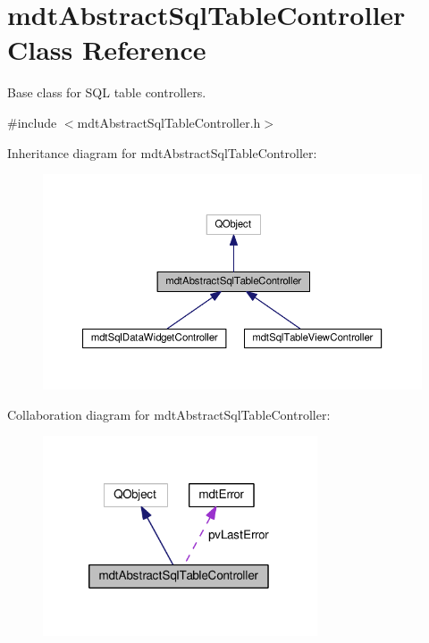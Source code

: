 \hypertarget{classmdt_abstract_sql_table_controller}{\section{mdt\-Abstract\-Sql\-Table\-Controller Class Reference}
\label{classmdt_abstract_sql_table_controller}
}


Base class for S\-Q\-L table controllers.  




{\ttfamily \#include $<$mdt\-Abstract\-Sql\-Table\-Controller.\-h$>$}



Inheritance diagram for mdt\-Abstract\-Sql\-Table\-Controller\-:\nopagebreak
\begin{figure}[H]
\begin{center}
\leavevmode
\includegraphics[width=350pt]{classmdt_abstract_sql_table_controller__inherit__graph}
\end{center}
\end{figure}


Collaboration diagram for mdt\-Abstract\-Sql\-Table\-Controller\-:\nopagebreak
\begin{figure}[H]
\begin{center}
\leavevmode
\includegraphics[width=230pt]{classmdt_abstract_sql_table_controller__coll__graph}
\end{center}
\end{figure}
